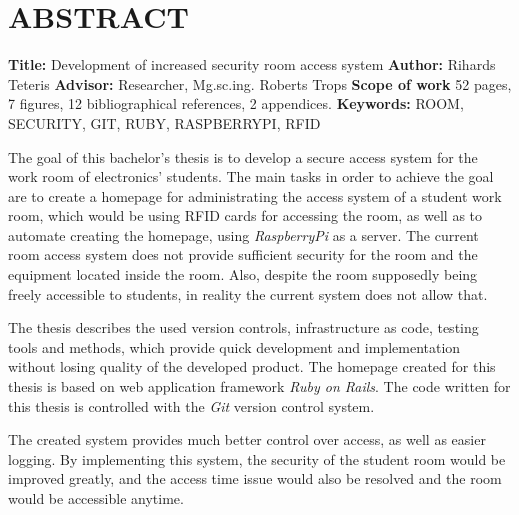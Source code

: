 \chapter*{ABSTRACT}
\noindent \textbf{Title:} Development of increased security room access system\newline
\textbf{Author:} Rihards Teteris\newline
\textbf{Advisor:} Researcher, Mg.sc.ing. Roberts Trops\newline
\textbf{Scope of work} 52 pages, 7 figures, 12 bibliographical references, 2 appendices.\newline
\textbf{Keywords:} ROOM, SECURITY, GIT, RUBY, RASPBERRYPI, RFID\newline

The goal of this bachelor's thesis is to develop a secure access system for the work room of  electronics' students.
The main tasks in order to achieve the goal are to create a homepage for administrating the access system of a student work room, which would be using RFID cards for accessing the room, as well as to automate creating the homepage, using \textit{RaspberryPi} as a server.
The current room access system does not provide sufficient security for the room and the equipment located inside the room. Also, despite the room supposedly being freely accessible to students, in reality the current system does not allow that.

The thesis describes the used version controls, infrastructure as code, testing tools and methods, which provide quick development and implementation without losing quality of the developed product. The homepage created for this thesis is based on web application framework \textit{Ruby on Rails}. The code written for this thesis is controlled with the \textit{Git} version control system.

The created system provides much better control over access, as well as easier logging. By implementing this system, the security of the student room would be improved greatly, and the access time issue would also be resolved and the room would be accessible anytime.
